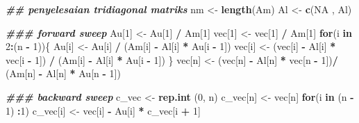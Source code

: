 \documentclass[
]{book}
\newenvironment{Shaded}{\begin{snugshade}}{\end{snugshade}}
\newcommand{\ConstantTok}[1]{\textcolor[rgb]{0.56,0.35,0.01}{#1}}
\newcommand{\ControlFlowTok}[1]{\textcolor[rgb]{0.13,0.29,0.53}{\textbf{#1}}}
\newcommand{\DecValTok}[1]{\textcolor[rgb]{0.00,0.00,0.81}{#1}}
\newcommand{\DocumentationTok}[1]{\textcolor[rgb]{0.56,0.35,0.01}{\textbf{\textit{#1}}}}
\newcommand{\FunctionTok}[1]{\textcolor[rgb]{0.13,0.29,0.53}{\textbf{#1}}}
\newcommand{\NormalTok}[1]{#1}
\newcommand{\OtherTok}[1]{\textcolor[rgb]{0.56,0.35,0.01}{#1}}
\newcommand{\SpecialCharTok}[1]{\textcolor[rgb]{0.81,0.36,0.00}{\textbf{#1}}}
\theoremstyle{definition}
\theoremstyle{definition}
\theoremstyle{definition}
\theoremstyle{definition}
\theoremstyle{remark}
\begin{document}
\begin{Shaded}
\begin{Highlighting}[]
  \DocumentationTok{\#\# penyelesaian tridiagonal matriks}
\NormalTok{  nm }\OtherTok{\textless{}{-}} \FunctionTok{length}\NormalTok{(Am)}
\NormalTok{  Al }\OtherTok{\textless{}{-}} \FunctionTok{c}\NormalTok{(}\ConstantTok{NA}\NormalTok{ , Al)}
  
  \DocumentationTok{\#\#\# forward sweep}
\NormalTok{  Au[}\DecValTok{1}\NormalTok{] }\OtherTok{\textless{}{-}}\NormalTok{ Au[}\DecValTok{1}\NormalTok{] }\SpecialCharTok{/}\NormalTok{ Am[}\DecValTok{1}\NormalTok{]}
\NormalTok{  vec[}\DecValTok{1}\NormalTok{] }\OtherTok{\textless{}{-}}\NormalTok{ vec[}\DecValTok{1}\NormalTok{] }\SpecialCharTok{/}\NormalTok{ Am[}\DecValTok{1}\NormalTok{]}
  \ControlFlowTok{for}\NormalTok{(i }\ControlFlowTok{in} \DecValTok{2}\SpecialCharTok{:}\NormalTok{(n }\SpecialCharTok{{-}} \DecValTok{1}\NormalTok{))\{}
\NormalTok{      Au[i] }\OtherTok{\textless{}{-}}\NormalTok{ Au[i] }\SpecialCharTok{/}\NormalTok{ (Am[i] }\SpecialCharTok{{-}}\NormalTok{ Al[i] }\SpecialCharTok{*}\NormalTok{ Au[i }\SpecialCharTok{{-}} \DecValTok{1}\NormalTok{])}
\NormalTok{      vec[i] }\OtherTok{\textless{}{-}}\NormalTok{ (vec[i] }\SpecialCharTok{{-}}\NormalTok{ Al[i] }\SpecialCharTok{*}\NormalTok{ vec[i }\SpecialCharTok{{-}} \DecValTok{1}\NormalTok{]) }\SpecialCharTok{/}
\NormalTok{                (Am[i] }\SpecialCharTok{{-}}\NormalTok{ Al[i] }\SpecialCharTok{*}\NormalTok{ Au[i }\SpecialCharTok{{-}} \DecValTok{1}\NormalTok{])}
\NormalTok{  \}}
\NormalTok{  vec[n] }\OtherTok{\textless{}{-}}\NormalTok{ (vec[n] }\SpecialCharTok{{-}}\NormalTok{ Al[n] }\SpecialCharTok{*}\NormalTok{ vec[n }\SpecialCharTok{{-}} \DecValTok{1}\NormalTok{])}\SpecialCharTok{/}
\NormalTok{            (Am[n] }\SpecialCharTok{{-}}\NormalTok{ Al[n] }\SpecialCharTok{*}\NormalTok{ Au[n }\SpecialCharTok{{-}} \DecValTok{1}\NormalTok{])}
  
  \DocumentationTok{\#\#\# backward sweep}
\NormalTok{  c\_vec }\OtherTok{\textless{}{-}} \FunctionTok{rep.int}\NormalTok{ (}\DecValTok{0}\NormalTok{, n)}
\NormalTok{  c\_vec[n] }\OtherTok{\textless{}{-}}\NormalTok{ vec[n]}
  \ControlFlowTok{for}\NormalTok{(i }\ControlFlowTok{in}\NormalTok{ (n }\SpecialCharTok{{-}} \DecValTok{1}\NormalTok{) }\SpecialCharTok{:}\DecValTok{1}\NormalTok{)}
\NormalTok{      c\_vec[i] }\OtherTok{\textless{}{-}}\NormalTok{ vec[i] }\SpecialCharTok{{-}}\NormalTok{ Au[i] }\SpecialCharTok{*}\NormalTok{ c\_vec[i }\SpecialCharTok{+} \DecValTok{1}\NormalTok{]}
  

\end{Highlighting}
\end{Shaded}
\end{document}
